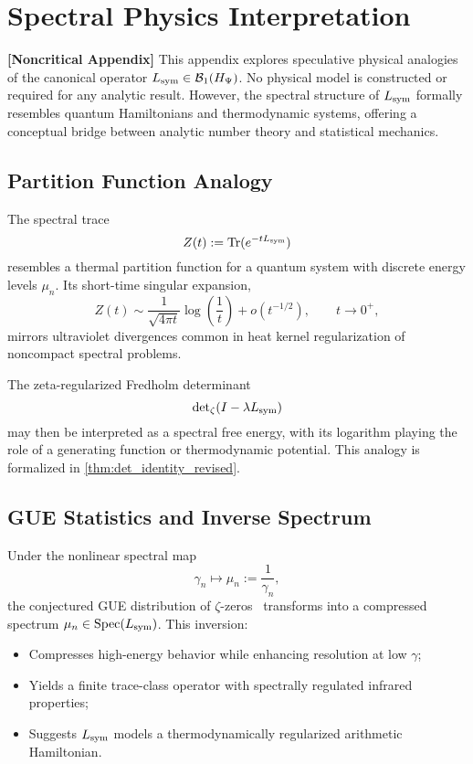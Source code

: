 \section{Spectral Physics Interpretation}
\label{app:spectral_physics_link}

\noindent\textbf{[Noncritical Appendix]}  
This appendix explores speculative physical analogies of the canonical operator \( L_{\mathrm{sym}} \in \mathcal{B}_1(H_{\Psi}) \). No physical model is constructed or required for any analytic result. However, the spectral structure of \( L_{\mathrm{sym}} \) formally resembles quantum Hamiltonians and thermodynamic systems, offering a conceptual bridge between analytic number theory and statistical mechanics.

\subsection*{Partition Function Analogy}

The spectral trace
\[
Z(t) := \operatorname{Tr}(e^{-t L_{\mathrm{sym}}})
\]
resembles a thermal partition function for a quantum system with discrete energy levels \( \mu_n \). Its short-time singular expansion,
\[
Z(t) \sim \frac{1}{\sqrt{4\pi t}} \log\left( \frac{1}{t} \right) + o(t^{-1/2}), \qquad t \to 0^+,
\]
mirrors ultraviolet divergences common in heat kernel regularization of noncompact spectral problems.

The zeta-regularized Fredholm determinant
\[
\det\nolimits_{\zeta}(I - \lambda L_{\mathrm{sym}})
\]
may then be interpreted as a spectral free energy, with its logarithm playing the role of a generating function or thermodynamic potential. This analogy is formalized in \cref{thm:det_identity_revised}.

\subsection*{GUE Statistics and Inverse Spectrum}

Under the nonlinear spectral map
\[
\gamma_n \longmapsto \mu_n := \frac{1}{\gamma_n},
\]
the conjectured GUE distribution of \( \zeta \)-zeros~\cite{Montgomery1973PairCorrelation, Berry1986RiemannSpectra} transforms into a compressed spectrum \( \mu_n \in \operatorname{Spec}(L_{\mathrm{sym}}) \). This inversion:
\begin{itemize}
  \item Compresses high-energy behavior while enhancing resolution at low \( \gamma \);
  \item Yields a finite trace-class operator with spectrally regulated infrared properties;
  \item Suggests \( L_{\mathrm{sym}} \) models a thermodynamically regularized arithmetic Hamiltonian.
\end{itemize}

